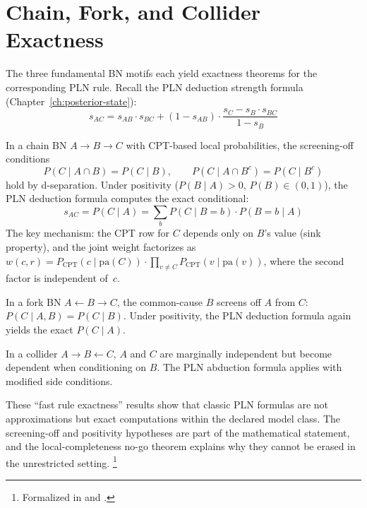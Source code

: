 \documentclass[11pt,openany]{report}
\begin{document}
\section{Chain, Fork, and Collider Exactness}
\label{sec:chain-fork-collider}

The three fundamental BN motifs each yield exactness theorems for the
corresponding PLN rule.  Recall the PLN deduction strength formula
(Chapter~\ref{ch:posterior-state}):
\[
  s_{AC} = s_{AB} \cdot s_{BC} + (1 - s_{AB}) \cdot
  \frac{s_C - s_B \cdot s_{BC}}{1 - s_B}
\]

\begin{theorem}
\label{thm:chain-exact}
In a chain BN $A \to B \to C$ with CPT-based local probabilities,
the screening-off conditions
\[
  P(C \mid A \cap B) = P(C \mid B), \qquad
  P(C \mid A \cap B^c) = P(C \mid B^c)
\]
hold by d-separation.  Under positivity ($P(B \mid A) > 0$, $P(B) \in (0,1)$),
the PLN deduction formula computes the exact conditional:
\[
  s_{AC} = P(C \mid A) = \sum_b P(C \mid B=b) \cdot P(B=b \mid A)
\]
The key mechanism: the CPT row for $C$ depends only on $B$'s value
(sink property), and the joint weight factorizes as
$w(c, r) = P_{\mathrm{CPT}}(c \mid \mathrm{pa}(C)) \cdot
\prod_{v \ne C} P_{\mathrm{CPT}}(v \mid \mathrm{pa}(v))$,
where the second factor is independent of~$c$.
\end{theorem}

\begin{theorem}
\label{thm:fork-exact}
In a fork BN $A \leftarrow B \to C$, the common-cause $B$ screens off
$A$ from $C$: $P(C \mid A, B) = P(C \mid B)$.  Under positivity, the
PLN deduction formula again yields the exact $P(C \mid A)$.
\end{theorem}

\begin{theorem}
In a collider $A \to B \leftarrow C$, $A$ and $C$ are marginally
independent but become dependent when conditioning on $B$.  The PLN
abduction formula applies with modified side conditions.
\end{theorem}

These ``fast rule exactness'' results show that classic PLN formulas are
not approximations but exact computations within the declared model class.
The screening-off and positivity hypotheses are part of the mathematical
statement, and the local-completeness no-go theorem explains why they
cannot be erased in the unrestricted setting.%
\footnote{Formalized in  and
  .}
\end{document}
